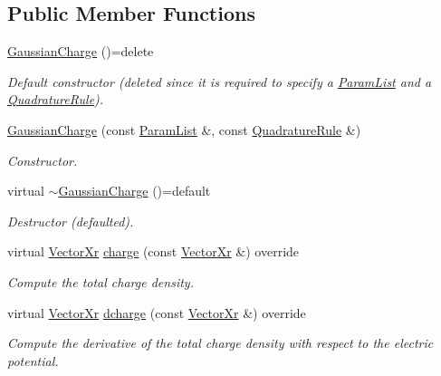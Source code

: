 \subsection*{Public Member Functions}
\begin{DoxyCompactItemize}
\item 
\hypertarget{classGaussianCharge_a860db9bf8bccf98756f1f6bd60de5463}{\hyperlink{classGaussianCharge_a860db9bf8bccf98756f1f6bd60de5463}{Gaussian\-Charge} ()=delete}\label{classGaussianCharge_a860db9bf8bccf98756f1f6bd60de5463}

\begin{DoxyCompactList}\small\item\em Default constructor (deleted since it is required to specify a \hyperlink{classParamList}{Param\-List} and a \hyperlink{classQuadratureRule}{Quadrature\-Rule}). \end{DoxyCompactList}\item 
\hyperlink{classGaussianCharge_a3e5ff9c43a3deb7861ea10435de4bb55}{Gaussian\-Charge} (const \hyperlink{classParamList}{Param\-List} \&, const \hyperlink{classQuadratureRule}{Quadrature\-Rule} \&)
\begin{DoxyCompactList}\small\item\em Constructor. \end{DoxyCompactList}\item 
\hypertarget{classGaussianCharge_ab64872dfef0abc7d116d65373496ac33}{virtual \hyperlink{classGaussianCharge_ab64872dfef0abc7d116d65373496ac33}{$\sim$\-Gaussian\-Charge} ()=default}\label{classGaussianCharge_ab64872dfef0abc7d116d65373496ac33}

\begin{DoxyCompactList}\small\item\em Destructor (defaulted). \end{DoxyCompactList}\item 
virtual \hyperlink{typedefs_8h_aae6cee78ed9cd8f234ed8cb48682548a}{Vector\-Xr} \hyperlink{classGaussianCharge_a97ff25e546dee1ee5fec866b290ec999}{charge} (const \hyperlink{typedefs_8h_aae6cee78ed9cd8f234ed8cb48682548a}{Vector\-Xr} \&) override
\begin{DoxyCompactList}\small\item\em Compute the total charge density. \end{DoxyCompactList}\item 
virtual \hyperlink{typedefs_8h_aae6cee78ed9cd8f234ed8cb48682548a}{Vector\-Xr} \hyperlink{classGaussianCharge_a06f7a60ee2bce4590e2a12286aa0e9eb}{dcharge} (const \hyperlink{typedefs_8h_aae6cee78ed9cd8f234ed8cb48682548a}{Vector\-Xr} \&) override
\begin{DoxyCompactList}\small\item\em Compute the derivative of the total charge density with respect to the electric potential. \end{DoxyCompactList}\end{DoxyCompactItemize}
